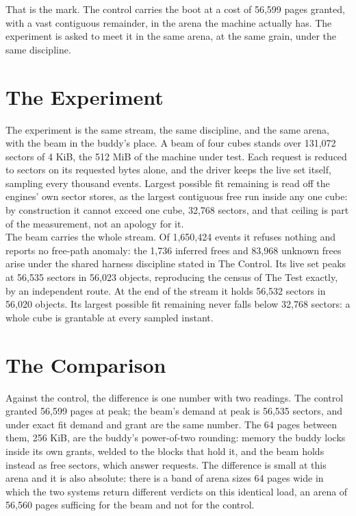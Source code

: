 \documentclass{article}
\begin{document}
That is the mark. The control carries the boot at a cost of 56,599 pages granted, with a vast contiguous remainder, in the arena the machine actually has. The experiment is asked to meet it in the same arena, at the same grain, under the same discipline.

\section{The Experiment}

The experiment is the same stream, the same discipline, and the same arena, with the beam in the buddy's place. A beam of four cubes stands over 131,072 sectors of 4 KiB, the 512 MiB of the machine under test. Each request is reduced to sectors on its requested bytes alone, and the driver keeps the live set itself, sampling every thousand events. Largest possible fit remaining is read off the engines' own sector stores, as the largest contiguous free run inside any one cube: by construction it cannot exceed one cube, 32,768 sectors, and that ceiling is part of the measurement, not an apology for it.\\

The beam carries the whole stream. Of 1,650,424 events it refuses nothing and reports no free-path anomaly: the 1,736 inferred frees and 83,968 unknown frees arise under the shared harness discipline stated in The Control. Its live set peaks at 56,535 sectors in 56,023 objects, reproducing the census of The Test exactly, by an independent route. At the end of the stream it holds 56,532 sectors in 56,020 objects. Its largest possible fit remaining never falls below 32,768 sectors: a whole cube is grantable at every sampled instant.

\section{The Comparison}

Against the control, the difference is one number with two readings. The control granted 56,599 pages at peak; the beam's demand at peak is 56,535 sectors, and under exact fit demand and grant are the same number. The 64 pages between them, 256 KiB, are the buddy's power-of-two rounding: memory the buddy locks inside its own grants, welded to the blocks that hold it, and the beam holds instead as free sectors, which answer requests. The difference is small at this arena and it is also absolute: there is a band of arena sizes 64 pages wide in which the two systems return different verdicts on this identical load, an arena of 56,560 pages sufficing for the beam and not for the control.\\
\end{document}
